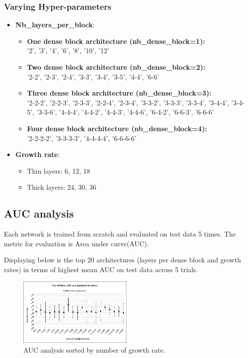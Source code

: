 \subsubsection{Varying Hyper-parameters}
\begin{itemize}
 \item \textbf{Nb\_layers\_per\_block}:
 \begin{itemize}
  \item \textbf{One dense block architecture (nb\_dense\_block=1):}\\
  '2', '3', '4', '6', '8', '10', '12'
  \item \textbf{Two dense block architecture (nb\_dense\_block=2):}\\
  '2-2', '2-3', '2-4', '3-3', '3-4', '3-5', '4-4', '6-6'
  \item \textbf{Three dense block architecture (nb\_dense\_block=3):}\\
  '2-2-2', '2-2-3', '2-3-3', '2-2-4', '2-3-4', '3-3-2', '3-3-3', '3-3-4', '3-4-4', '3-4-5', '3-3-6', '4-4-4', '4-4-2', '4-4-3', '4-4-6', '6-4-2', '6-6-3', '6-6-6'
  \item \textbf{Four dense block architecture (nb\_dense\_block=4):}\\
  '2-2-2-2', '3-3-3-3', '4-4-4-4', '6-6-6-6'
 \end{itemize}
 \item \textbf{Growth rate}:
  \begin{itemize}
  \item Thin layers: 6, 12, 18
  \item Thick layers: 24, 30, 36
 \end{itemize}
 
\end{itemize}
\flushbottom
\newpage

\subsection{AUC analysis}
Each network is trained from scratch and evaluated on test data 5 times. The metric for evaluation is Area under curve(AUC). 

Displaying below is the top 20 architectures (layers per dense block and growth rates) in terms of highest mean AUC on test data across 5 trials.  

\begin{figure}[ht]
\centering
\includegraphics[width=0.5\textwidth]{images/densenet/auc_analysis_sortedby_growth.png}
\caption{\label{fig:meanAUC_growth}AUC analysis sorted by number of growth rate.}
\end{figure}

